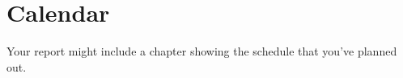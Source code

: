 \chapter{Calendar}
\label{ch:calendar}

Your report might include a chapter showing the schedule that you've
planned out.


